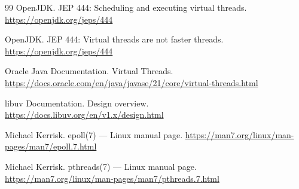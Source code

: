 \documentclass[UTF8,zihao=-4]{ctexart}
\begin{document}
\begin{thebibliography}{99}
OpenJDK.
\newblock JEP 444: Scheduling and executing virtual threads.
\newblock \url{https://openjdk.org/jeps/444}

OpenJDK.
\newblock JEP 444: Virtual threads are not faster threads.
\newblock \url{https://openjdk.org/jeps/444}

Oracle Java Documentation.
\newblock Virtual Threads.
\newblock \url{https://docs.oracle.com/en/java/javase/21/core/virtual-threads.html}

libuv Documentation.
\newblock Design overview.
\newblock \url{https://docs.libuv.org/en/v1.x/design.html}

Michael Kerrisk.
\newblock epoll(7) --- Linux manual page.
\newblock \url{https://man7.org/linux/man-pages/man7/epoll.7.html}

Michael Kerrisk.
\newblock pthreads(7) --- Linux manual page.
\newblock \url{https://man7.org/linux/man-pages/man7/pthreads.7.html}

\end{thebibliography}
\end{document}
